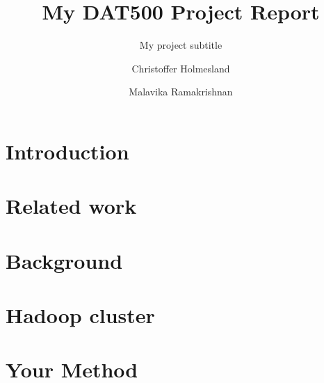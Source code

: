 \documentclass[sigconf]{acmart}
\begin{document}
\title{My DAT500 Project Report}
\subtitle{My project subtitle}

\author{Christoffer Holmesland}

\author{Malavika Ramakrishnan}




\begin{abstract}

\end{abstract}


\maketitle


\section{Introduction}
\label{sec:introduction}


\section{Related work}
\label{sec:relatedwork}


\section{Background}
\label{sec:background}


\section{Hadoop cluster}
\label{sec:hadoop}


\section{Your Method}
\label{sec:method}

\end{document}
